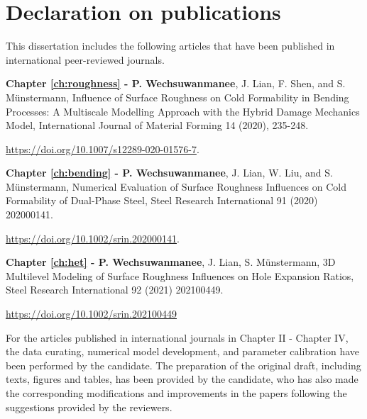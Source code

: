 \chapter*{Declaration on publications}

This dissertation includes the following articles that have been published in international peer-reviewed journals.

\vspace{20pt}

\textbf{Chapter \ref{ch:roughness} - P. Wechsuwanmanee}, J. Lian, F. Shen, and S. Münstermann, Influence of Surface Roughness on Cold Formability in Bending Processes: A Multiscale Modelling Approach with the Hybrid Damage Mechanics Model, International Journal of Material Forming 14 (2020), 235-248.

\vspace{5pt}

\noindent \url{https://doi.org/10.1007/s12289-020-01576-7}.

\vspace{20pt}

\textbf{Chapter \ref{ch:bending} - P. Wechsuwanmanee}, J. Lian, W. Liu, and S. Münstermann, Numerical Evaluation of Surface Roughness Influences on Cold Formability of Dual-Phase Steel, Steel Research International 91 (2020) 202000141.

\vspace{5pt}

\noindent \url{https://doi.org/10.1002/srin.202000141}.

\vspace{20pt}

\textbf{Chapter \ref{ch:het} - P. Wechsuwanmanee}, J. Lian, S. Münstermann, 3D Multilevel Modeling of Surface Roughness Influences on Hole Expansion Ratios, Steel Research International 92 (2021) 202100449.

\vspace{5pt}

\noindent \url{https://doi.org/10.1002/srin.202100449}

\vspace{20pt}

For the articles published in international journals in Chapter II - Chapter IV, the data curating, numerical model development, and parameter calibration have been performed by the candidate. The preparation of the original draft, including texts, figures and tables, has been provided by the candidate, who has also made the corresponding modifications and improvements in the papers following the suggestions provided by the reviewers.